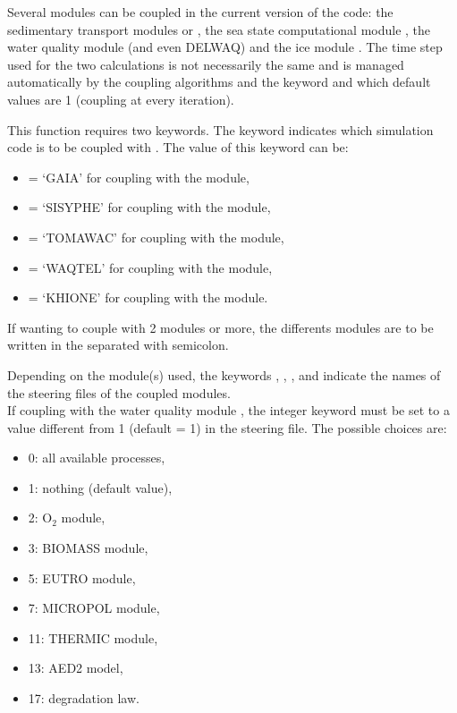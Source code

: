 Several modules can be coupled in the current version of the code:
the sedimentary transport modules \gaia or \sisyphe,
the sea state computational module \tomawac,
the water quality module \waqtel (and even DELWAQ)
and the ice module \khione.
The time step used for the two calculations is not necessarily the same and is
managed automatically by the coupling algorithms
and the keyword  and
 which default values are 1
(coupling at every iteration).

This function requires two keywords.
The keyword  indicates which simulation code is to be
coupled with .
The value of this keyword can be:

\begin{itemize}
\item {} = `GAIA' for coupling with the \gaia module,

\item {} = `SISYPHE' for coupling with the \sisyphe module,

\item {} = `TOMAWAC' for coupling with the \tomawac module,

\item {} = `WAQTEL' for coupling with the \waqtel module,

\item {} = `KHIONE' for coupling with the \khione module.

\end{itemize}

If wanting to couple with 2 modules or more, the differents modules are to
be written in the  separated with semicolon.

Depending on the module(s) used, the keywords
, ,
, 
and 
indicate the names of the steering files
of the coupled modules.\\

If coupling with the water quality module \waqtel, the integer keyword
 must be set to a value different from 1
(default = 1) in the  steering file.
The possible choices are:
\begin{itemize}
\item 0: all available processes,
\item 1: nothing (default value),
\item 2: O$_2$ module,
\item 3: BIOMASS module,
\item 5: EUTRO module,
\item 7: MICROPOL module,
\item 11: THERMIC module,
\item 13: AED2 model,
\item 17: degradation law.
\end{itemize}

